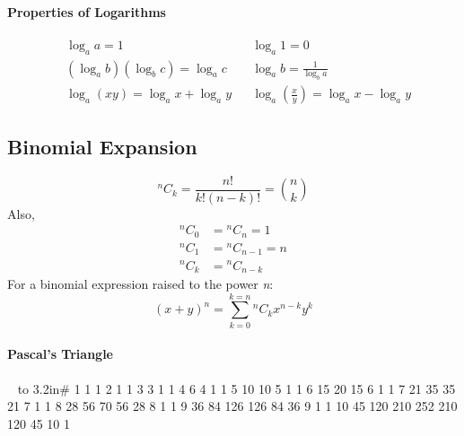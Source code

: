 \paragraph{Properties of Logarithms}
\begin{align*}
&\log_aa  = 1 &   &\log_a1 = 0 \\
&(\log_ab)(\log_bc) = \log_ac & &\log_ab = \frac{1}{\log_ba} \\
&\log_a(xy) = \log_ax + \log_ay &
&\log_a\left(\frac{x}{y}\right) = \log_ax - \log_ay
\end{align*}


\subsection{Binomial Expansion}
$$^nC_k = \frac{n!}{k!(n-k)!} = {n\choose k} $$
Also,
\begin{align*}
	{^nC_0} &= {^nC_n} = 1 \\
	{^nC_1} &= {^nC_{n-1}} = n \\
	{^nC_k} &= {^nC_{n-k}}
\end{align*}
For a binomial expression raised to the power \emph{n}:
$${(x+y)}^n  = \sum_{k=0}^{k=n} {^nC_k} x^{n-k}y^k$$
\paragraph{Pascal's Triangle}
\begin{center}
	~
\vbox{\offinterlineskip
	\halign to 3.2in{\quad\hfil#\hfil{} \cr\noalign{\vskip 1 mm}
		1\hskip5.010mm 1 \cr\noalign{\vskip 1 mm}
		1\hskip5.015mm 2\hskip5.015mm 1 \cr\noalign{\vskip 1 mm}
		1\hskip5.025mm 3\hskip5.025mm 3\hskip5.025mm 1 \cr\noalign{\vskip 1 mm}
		1\hskip5.05mm 4\hskip5.05mm 6\hskip5.05mm 4\hskip5.05mm 1 \cr\noalign{\vskip 1.5 mm}
		1\hskip5mm 5\hskip5mm 10\hskip5mm 10\hskip5mm 5\hskip5mm 1 \cr\noalign{\vskip 1.5 mm}
		1\hskip4.90mm 6\hskip4.90mm 15\hskip4.90mm 20\hskip4.90mm 15\hskip4.90mm 6\hskip4.90mm 1 \cr\noalign{\vskip 1.5 mm}
		1\hskip4.75mm 7\hskip4.75mm 21\hskip4.75mm 35\hskip4.75mm 35\hskip4.75mm 21\hskip4.75mm 7\hskip4.75mm 1 \cr\noalign{\vskip 1.5 mm}
		1\hskip4.5mm 8\hskip4.5mm 28\hskip4.5mm 56\hskip4.5mm 70\hskip4.5mm 56\hskip4.5mm 28\hskip4.5mm 8\hskip4.5mm 1 \cr\noalign{\vskip 1.5 mm}
		1\hskip4mm 9\hskip4mm 36\hskip4mm 84\hskip4mm 126\hskip4mm 126\hskip4mm 84\hskip4mm 36\hskip4mm 9\hskip4mm 1 \cr\noalign{\vskip 1.5 mm}
		1\hskip3mm 10\hskip3mm 45\hskip3mm 120\hskip3mm 210\hskip3mm 252\hskip3mm 210\hskip3mm 120\hskip3mm 45\hskip3mm 10\hskip3mm 1 \cr\noalign{\vskip 1.5 mm}
	}
}
\end{center}
